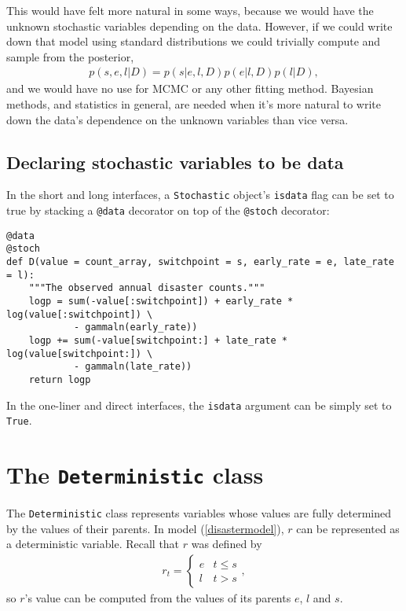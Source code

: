 This would have felt more natural in some ways, because we would have the unknown stochastic variables depending on the data. However, if we could write down that model using standard distributions we could trivially compute and sample from the posterior,
\begin{eqnarray*}
    p(s,e,l|D) = p(s|e, l, D) p(e|l, D) p(l|D),
\end{eqnarray*}
and we would have no use for MCMC or any other fitting method. Bayesian methods, and statistics in general, are needed when it's more natural to write down the data's dependence on the unknown variables than vice versa.

\subsection{Declaring stochastic variables to be data}

In the short and long interfaces, a \texttt{Stochastic} object's \texttt{isdata} flag can be set to true by stacking a \texttt{@data} decorator on top of the \texttt{@stoch} decorator:
\begin{verbatim}
@data
@stoch
def D(value = count_array, switchpoint = s, early_rate = e, late_rate = l):
    """The observed annual disaster counts."""
    logp = sum(-value[:switchpoint]) + early_rate * log(value[:switchpoint]) \
            - gammaln(early_rate))
    logp += sum(-value[switchpoint:] + late_rate * log(value[switchpoint:]) \
            - gammaln(late_rate))
    return logp
\end{verbatim}
In the one-liner and direct interfaces, the \texttt{isdata} argument can be simply set to \texttt{True}.


\section{The \texttt{Deterministic} class}\label{dtrm}

The \texttt{Deterministic} class represents variables whose values are fully determined by the values of their parents. In model (\ref{disastermodel}), $r$ can be represented as a deterministic variable. Recall that $r$ was defined by
\begin{eqnarray*}
    r_t=\left\{\begin{array}{ll}
        e & t\le s\\ l & t>s
        \end{array}\right.,
\end{eqnarray*}
so $r$'s value can be computed from the values of its parents $e$, $l$ and $s$.

